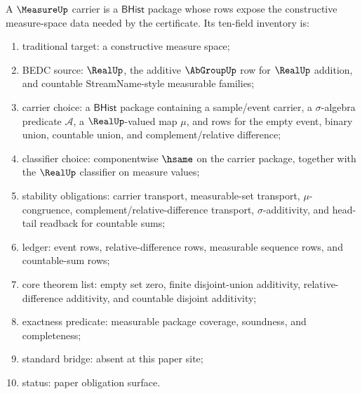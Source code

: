 \begin{definition}
\label{def:measureup-carrier-obligation-inventory}
A $\MeasureUp$ carrier is a $\mathsf{BHist}$ package whose rows expose the
constructive measure-space data needed by the certificate. Its ten-field
inventory is:
\begin{enumerate}
  \item traditional target: a constructive measure space;
  \item BEDC source: $\RealUp$, the additive $\AbGroupUp$ row for $\RealUp$
  addition, and countable StreamName-style measurable families;
  \item carrier choice: a $\mathsf{BHist}$ package containing a sample/event
  carrier, a $\sigma$-algebra predicate $\mathcal{A}$, a $\RealUp$-valued map
  $\mu$, and rows for the empty event, binary union, countable union, and
  complement/relative difference;
  \item classifier choice: componentwise $\hsame$ on the carrier package,
  together with the $\RealUp$ classifier on measure values;
  \item stability obligations: carrier transport, measurable-set transport,
  $\mu$-congruence, complement/relative-difference transport,
  $\sigma$-additivity, and head-tail readback for countable sums;
  \item ledger: event rows, relative-difference rows, measurable sequence
  rows, and countable-sum rows;
  \item core theorem list: empty set zero, finite disjoint-union additivity,
  relative-difference additivity, and countable disjoint additivity;
  \item exactness predicate: measurable package coverage, soundness, and
  completeness;
  \item standard bridge: absent at this paper site;
  \item status: paper obligation surface.
\end{enumerate}
\end{definition}

